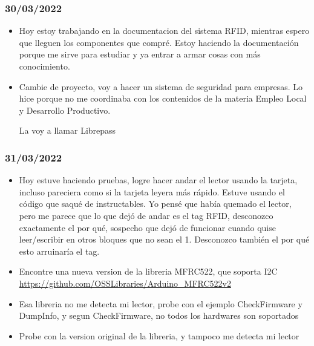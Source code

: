 \documentclass[../informe_krapp.tex]{subfiles}
\begin{document}
\subsubsection{30/03/2022}
\begin{itemize}
	\item Hoy estoy trabajando en la documentacion del sistema RFID, mientras espero
	      que lleguen los componentes que compré. Estoy haciendo la documentación porque
	      me sirve para estudiar y ya entrar a armar cosas con más conocimiento.
	\item Cambie de proyecto, voy a hacer un sistema de seguridad para empresas.
	      Lo hice porque no me coordinaba con los contenidos de la materia
	      Empleo Local y Desarrollo Productivo.

	      La voy a llamar Librepass
\end{itemize}

\subsubsection{31/03/2022}
\begin{itemize}
	\item Hoy estuve haciendo pruebas, logre hacer andar el lector usando la tarjeta,
	      incluso pareciera como si la tarjeta leyera más rápido. Estuve usando el
	      código que saqué de instructables.
	      Yo pensé que había quemado el lector, pero me parece que lo que
	      dejó de andar es el tag RFID, desconozco exactamente el por qué, sospecho
	      que dejó de funcionar cuando quise leer/escribir en otros bloques
	      que no sean el 1. Desconozco también el por qué esto arruinaría el tag.
	\item Encontre una nueva version de la libreria MFRC522, que soporta I2C
	      \url{https://github.com/OSSLibraries/Arduino_MFRC522v2}
	\item Esa libreria no me detecta mi lector, probe con el ejemplo CheckFirmware y
	      DumpInfo, y segun CheckFirmware, no todos los hardwares son soportados
	\item Probe con la version original de la libreria, y tampoco me detecta mi lector
\end{itemize}
\end{document}
